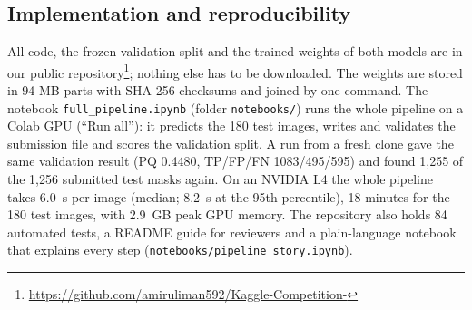 \subsection{Implementation and reproducibility}\label{sec:code}
All code, the frozen validation split and the trained weights of both
models are in our public repository\footnote{\url{https://github.com/amiruliman592/Kaggle-Competition-}};
nothing else has to be downloaded. The weights are stored in 94-MB parts
with SHA-256 checksums and joined by one command. The notebook
\texttt{full\_\allowbreak pipeline.ipynb} (folder \texttt{notebooks/})
runs the whole pipeline on a Colab
GPU (``Run all''): it predicts the 180 test images, writes and validates
the submission file and scores the validation split. A run from a fresh
clone gave the same validation result (PQ 0.4480, TP/FP/FN 1083/495/595)
and found 1{,}255 of the 1{,}256 submitted test masks again. On an NVIDIA L4
the whole pipeline takes 6.0~s per image (median; 8.2~s at the 95th
percentile), 18 minutes for the 180 test images, with 2.9~GB peak GPU
memory. The repository also holds 84 automated tests, a README guide for
reviewers and a plain-language notebook that explains every step
(\texttt{notebooks/pipeline\_story.ipynb}).



